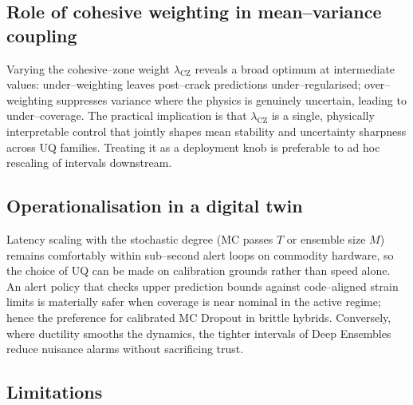 \documentclass{article}
\begin{document}
\subsection{Role of cohesive weighting in mean–variance coupling}
Varying the cohesive–zone weight $\lambda_{\mathrm{CZ}}$ reveals a broad optimum at intermediate values: under–weighting leaves post–crack predictions under–regularised; over–weighting suppresses variance where the physics is genuinely uncertain, leading to under–coverage. The practical implication is that $\lambda_{\mathrm{CZ}}$ is a single, physically interpretable control that jointly shapes mean stability and uncertainty sharpness across UQ families. Treating it as a deployment knob is preferable to ad hoc rescaling of intervals downstream.

\subsection{Operationalisation in a digital twin}
Latency scaling with the stochastic degree (MC passes $T$ or ensemble size $M$) remains comfortably within sub–second alert loops on commodity hardware, so the choice of UQ can be made on calibration grounds rather than speed alone. An alert policy that checks upper prediction bounds against code–aligned strain limits is materially safer when coverage is near nominal in the active regime; hence the preference for calibrated MC Dropout in brittle hybrids. Conversely, where ductility smooths the dynamics, the tighter intervals of Deep Ensembles reduce nuisance alarms without sacrificing trust.

\subsection{Limitations}
\label{sec:limitations}
\end{document}
